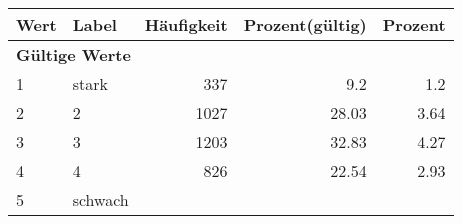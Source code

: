      \begin{longtable}{lXrrr}
     \toprule
     \textbf{Wert} & \textbf{Label} & \textbf{Häufigkeit} & \textbf{Prozent(gültig)} & \textbf{Prozent} \\
     \endhead
     \midrule
     \multicolumn{5}{l}{\textbf{Gültige Werte}}\\

     1 &
     \multicolumn{1}{X}{ stark   } &


       \num{337} &
       \num[round-mode=places,round-precision=2]{9,2} &
         \num[round-mode=places,round-precision=2]{1,2} \\

     2 &
     \multicolumn{1}{X}{ 2   } &


       \num{1027} &
       \num[round-mode=places,round-precision=2]{28,03} &
         \num[round-mode=places,round-precision=2]{3,64} \\

     3 &
     \multicolumn{1}{X}{ 3   } &


       \num{1203} &
       \num[round-mode=places,round-precision=2]{32,83} &
         \num[round-mode=places,round-precision=2]{4,27} \\

     4 &
     \multicolumn{1}{X}{ 4   } &


       \num{826} &
       \num[round-mode=places,round-precision=2]{22,54} &
         \num[round-mode=places,round-precision=2]{2,93} \\

     5 &
     \multicolumn{1}{X}{ schwach   } &



\end{longtable}
